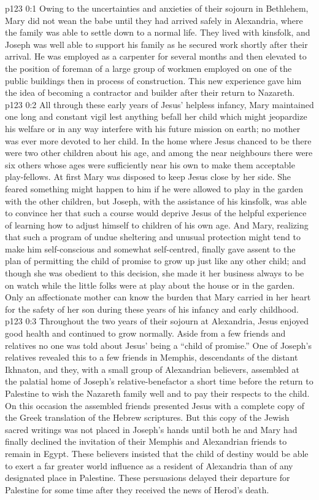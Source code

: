 \author{Midwayer Commission}
\vs p123 0:1 Owing to the uncertainties and anxieties of their sojourn in Bethlehem, Mary did not wean the babe until they had arrived safely in Alexandria, where the family was able to settle down to a normal life. They lived with kinsfolk, and Joseph was well able to support his family as he secured work shortly after their arrival. He was employed as a carpenter for several months and then elevated to the position of foreman of a large group of workmen employed on one of the public buildings then in process of construction. This new experience gave him the idea of becoming a contractor and builder after their return to Nazareth.
\vs p123 0:2 \pc All through these early years of Jesus’ helpless infancy, Mary maintained one long and constant vigil lest anything befall her child which might jeopardize his welfare or in any way interfere with his future mission on earth; no mother was ever more devoted to her child. In the home where Jesus chanced to be there were two other children about his age, and among the near neighbours there were six others whose ages were sufficiently near his own to make them acceptable play\hyp{}fellows. At first Mary was disposed to keep Jesus close by her side. She feared something might happen to him if he were allowed to play in the garden with the other children, but Joseph, with the assistance of his kinsfolk, was able to convince her that such a course would deprive Jesus of the helpful experience of learning how to adjust himself to children of his own age. And Mary, realizing that such a program of undue sheltering and unusual protection might tend to make him self\hyp{}conscious and somewhat self\hyp{}centred, finally gave assent to the plan of permitting the child of promise to grow up just like any other child; and though she was obedient to this decision, she made it her business always to be on watch while the little folks were at play about the house or in the garden. Only an affectionate mother can know the burden that Mary carried in her heart for the safety of her son during these years of his infancy and early childhood.
\vs p123 0:3 Throughout the two years of their sojourn at Alexandria, Jesus enjoyed good health and continued to grow normally. Aside from a few friends and relatives no one was told about Jesus’ being a “child of promise.” One of Joseph’s relatives revealed this to a few friends in Memphis, descendants of the distant Ikhnaton, and they, with a small group of Alexandrian believers, assembled at the palatial home of Joseph’s relative\hyp{}benefactor a short time before the return to Palestine to wish the Nazareth family well and to pay their respects to the child. On this occasion the assembled friends presented Jesus with a complete copy of the Greek translation of the Hebrew scriptures. But this copy of the Jewish sacred writings was not placed in Joseph’s hands until both he and Mary had finally declined the invitation of their Memphis and Alexandrian friends to remain in Egypt. These believers insisted that the child of destiny would be able to exert a far greater world influence as a resident of Alexandria than of any designated place in Palestine. These persuasions delayed their departure for Palestine for some time after they received the news of Herod’s death.
